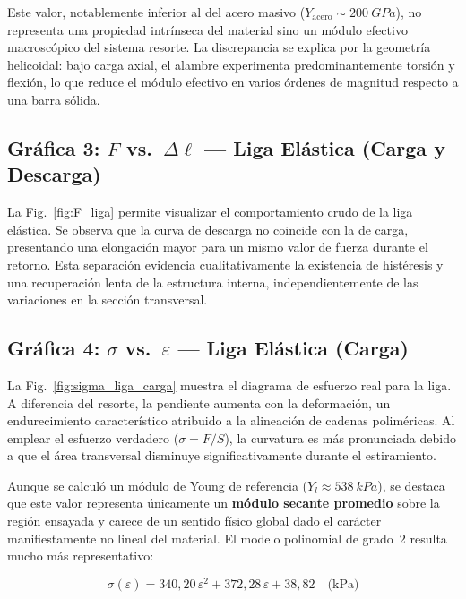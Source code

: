 Este valor, notablemente inferior al del acero masivo
($Y_\text{acero} \sim \qty{200}{GPa}$), no representa una propiedad
intrínseca del material sino un módulo efectivo macroscópico del sistema
resorte. La discrepancia se explica por la geometría helicoidal: bajo carga 
axial, el alambre experimenta predominantemente torsión y flexión, lo que 
reduce el módulo efectivo en varios órdenes de magnitud respecto a una 
barra sólida.

\subsection{Gráfica 3: \texorpdfstring{$F$ vs.\ $\Delta\ell$}{F vs. Delta l} — Liga Elástica (Carga y Descarga)}

La Fig.~\ref{fig:F_liga} permite visualizar el comportamiento crudo de la liga 
elástica. Se observa que la curva de descarga no coincide con la de carga, 
presentando una elongación mayor para un mismo valor de fuerza durante el 
retorno. Esta separación evidencia cualitativamente la existencia de histéresis 
y una recuperación lenta de la estructura interna, independientemente de las 
variaciones en la sección transversal.

\subsection{Gráfica 4: \texorpdfstring{$\sigma$ vs.\ $\varepsilon$}{sigma vs. epsilon} — Liga Elástica (Carga)}

La Fig.~\ref{fig:sigma_liga_carga} muestra el diagrama de esfuerzo real para 
la liga. A diferencia del resorte, la pendiente aumenta con la deformación, 
un endurecimiento característico atribuido a la alineación de cadenas 
poliméricas. Al emplear el esfuerzo verdadero ($\sigma = F/S$), la curvatura 
es más pronunciada debido a que el área transversal disminuye significativamente 
durante el estiramiento.

Aunque se calculó un módulo de Young de referencia ($Y_l \approx \qty{538}{kPa}$), 
se destaca que este valor representa únicamente un \textbf{módulo secante promedio} 
sobre la región ensayada y carece de un sentido físico global dado el carácter 
manifiestamente no lineal del material. El modelo polinomial de grado~2 resulta 
mucho más representativo:

\begin{equation*}
    \sigma(\varepsilon) = 340{,}20\,\varepsilon^2 + 372{,}28\,\varepsilon
                        + 38{,}82 \quad \text{(kPa)}
\end{equation*}

